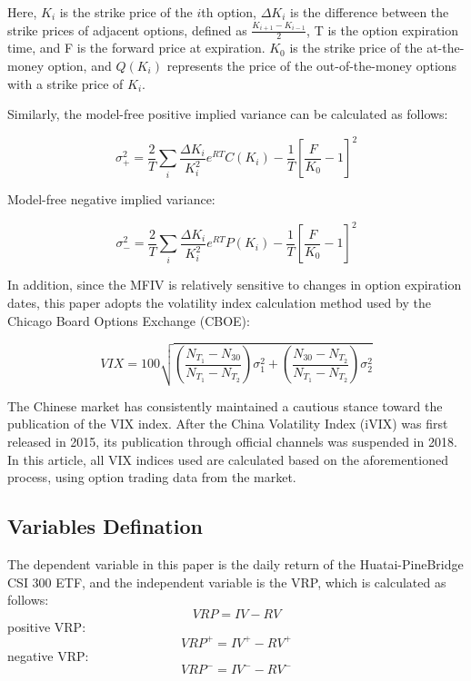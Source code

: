 \documentclass[a4paper, 12pt]{article}    %
\begin{document}
Here, $K_i$ is the strike price of the $i$th option, $\Delta K_i$ is the difference between the strike prices of adjacent options, defined as $\frac{K_{i+1}-K_{i-1}}{2}$, T is the option expiration time, and F is the forward price at expiration. $K_0$ is the strike price of the at-the-money option, and $Q(K_i)$ represents the price of the out-of-the-money options with a strike price of $K_i$.

Similarly, the model-free positive implied variance can be calculated as follows:

\begin{equation}
    \sigma^2_+ = \frac{2}{T} \sum_i \frac{\Delta K_i}{K_i^2} e^{RT} C(K_i) - \frac{1}{T} \left[ \frac{F}{K_0} - 1 \right]^2
\end{equation}

Model-free negative implied variance:

\begin{equation}
    \sigma^2_- = \frac{2}{T} \sum_i \frac{\Delta K_i}{K_i^2} e^{RT} P(K_i) - \frac{1}{T} \left[ \frac{F}{K_0} - 1 \right]^2
\end{equation}

In addition, since the MFIV is relatively sensitive to changes in option expiration dates, this paper adopts the volatility index calculation method used by the Chicago Board Options Exchange (CBOE):

\begin{equation}
    VIX = 100\sqrt{\left( \frac{N_{T_1} - N_{30}}{N_{T_1} - N_{T_2}} \right) \sigma_1^2 + \left( \frac{N_{30} - N_{T_2}}{N_{T_1} - N_{T_2}} \right) \sigma_2^2}
\end{equation}

The Chinese market has consistently maintained a cautious stance toward the publication of the VIX index. After the China Volatility Index (iVIX) was first released in 2015, its publication through official channels was suspended in 2018. In this article, all VIX indices used are calculated based on the aforementioned process, using option trading data from the market.
	
    \subsection{Variables Defination}
        The dependent variable in this paper is the daily return of the Huatai-PineBridge CSI 300 ETF, and the independent variable is the VRP, which is calculated as follows:
        \begin{equation}
        VRP = IV - RV
        \end{equation}
        positive VRP:
        \begin{equation}
        VRP^+ = IV^+ - RV^+
        \end{equation}
        negative VRP:
        \begin{equation}
        VRP^- = IV^- - RV^-
        \end{equation}
        
\end{document}
